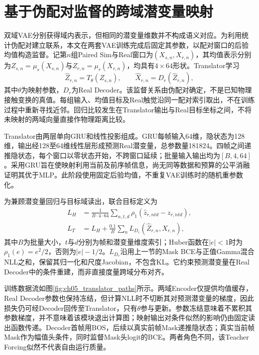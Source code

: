 \section{基于伪配对监督的跨域潜变量映射}
\label{sec:ch05_latent_translator}

双域VAE分别获得域内表示，但相同的潜变量维数并不构成语义对应。为利用统计伪配对建立联系，本文在两套VAE训练完成后固定其参数，以配对窗口的后验均值构造监督。记第$n$组Paired Sim与Real窗口为$(X_{s,n},X_{r,n})$，其均值表示分别为$Z_{s,n}=\mu_s(X_{s,n})$与$Z_{r,n}=\mu_r(X_{r,n})$，均具有$4\times64$形状。Translator学习
\begin{equation}
 \widehat Z_{r,n}=T_\theta(Z_{s,n}),\qquad
 \widehat X_{r,n}=D_r(\widehat Z_{r,n}),
 \label{eq:ch05_translator_mapping}
\end{equation}
其中$\theta$为映射参数，$D_r$为Real Decoder。该监督关系由伪配对确定，不是已知物理接触变换的真值。每组输入、均值目标及Real触觉沿同一配对索引取出，不在训练过程中重新寻找近邻。回归比较发生在Translator输出与Real目标坐标之间，不将未映射的两域向量直接作物理距离比较。

Translator由两层单向GRU和线性投影组成。GRU每帧输入64维，隐状态为128维，输出经128至64维线性层形成预测Real潜变量，总参数量181824。四帧之间递推隐状态，每个窗口以零状态开始，不跨窗口延续；批量输入输出均为$[B,4,64]$。采用GRU旨在使映射利用当前及前序帧信息，尚无同等数据和预算的公平消融证明其优于MLP。此阶段使用固定后验均值，不重复VAE训练时的随机重参数化。

为兼顾潜变量回归与目标域读出，联合目标定义为
\begin{equation}
 \begin{aligned}
 L_H&=\frac1{B\cdot4\cdot64}\sum_{n,t,d}
 \rho_1(\widehat z_{r,ntd}-z_{r,ntd}),\\
 L_T&=L_H+\frac{0.1}{B}\sum_n
 L_{D_r}(\widehat Z_{r,n},X_{r,n}),
 \end{aligned}
 \label{eq:ch05_translator_objective}
\end{equation}
其中$B$为批量大小，$t$与$d$分别为帧和潜变量维度索引；Huber函数在$|e|<1$时为$\rho_1(e)=e^2/2$，否则为$|e|-1/2$。$L_{D_r}$沿用上一节的Mask BCE与正值Gamma混合NLL之和，保留其归一化和尺度Jacobian，不包含KL。它约束预测潜变量在Real Decoder中的条件重建，而非直接度量跨域分布对齐。

训练数据流如图\ref{fig:ch05_translator_paths}所示。两域Encoder仅提供均值缓存，Real Decoder参数也保持冻结，但计算NLL时不切断其对预测潜变量的梯度，因此损失仍可经Decoder回传至Translator，只有$\theta$参与更新。参数冻结意味着不累积其参数梯度，并不意味着该模块退出计算图；映射输出对条件似然的影响仍由固定读出函数传递。Decoder首帧用BOS，后续以真实前帧Mask递推隐状态；真实当前帧Mask作为幅值头条件，同时监督Mask头logit的BCE。两者角色不同，该Teacher Forcing似然不代表自由运行质量。

